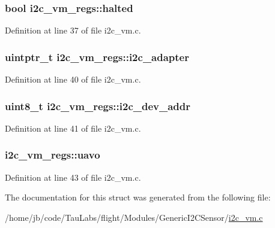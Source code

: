 \hypertarget{structi2c__vm__regs_aa3c803fa05ab57a838ae6b617d34482e}{
\subsubsection[{halted}]{\setlength{\rightskip}{0pt plus 5cm}bool {\bf i2c\-\_\-vm\-\_\-regs\-::halted}}}\label{structi2c__vm__regs_aa3c803fa05ab57a838ae6b617d34482e}


\-Definition at line 37 of file i2c\-\_\-vm.\-c.

\hypertarget{structi2c__vm__regs_a70b3400858879a31d7a1a032f6b2807e}{
\subsubsection[{i2c\-\_\-adapter}]{\setlength{\rightskip}{0pt plus 5cm}uintptr\-\_\-t {\bf i2c\-\_\-vm\-\_\-regs\-::i2c\-\_\-adapter}}}\label{structi2c__vm__regs_a70b3400858879a31d7a1a032f6b2807e}


\-Definition at line 40 of file i2c\-\_\-vm.\-c.

\hypertarget{structi2c__vm__regs_a3f919c5ae80615db316bec29bd0d1156}{
\subsubsection[{i2c\-\_\-dev\-\_\-addr}]{\setlength{\rightskip}{0pt plus 5cm}uint8\-\_\-t {\bf i2c\-\_\-vm\-\_\-regs\-::i2c\-\_\-dev\-\_\-addr}}}\label{structi2c__vm__regs_a3f919c5ae80615db316bec29bd0d1156}


\-Definition at line 41 of file i2c\-\_\-vm.\-c.

\hypertarget{structi2c__vm__regs_a7c478bf7f2b9d2dc1501e92e1368b69e}{
\subsubsection[{uavo}]{ {\bf i2c\-\_\-vm\-\_\-regs\-::uavo}}}\label{structi2c__vm__regs_a7c478bf7f2b9d2dc1501e92e1368b69e}


\-Definition at line 43 of file i2c\-\_\-vm.\-c.



\-The documentation for this struct was generated from the following file\-:\begin{DoxyCompactItemize}
\item 
/home/jb/code/\-Tau\-Labs/flight/\-Modules/\-Generic\-I2\-C\-Sensor/\hyperlink{i2c__vm_8c}{i2c\-\_\-vm.\-c}\end{DoxyCompactItemize}
